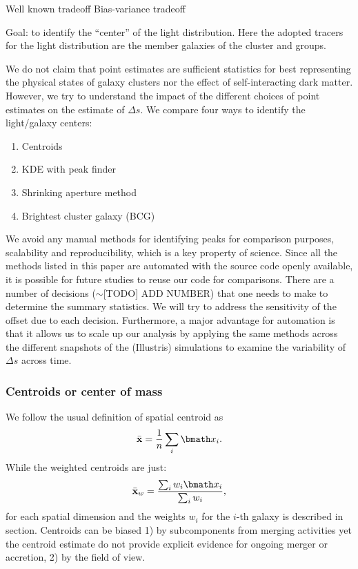 Well known tradeoff Bias-variance tradeoff

Goal: to identify the ``center'' of the light distribution. Here the adopted 
tracers for the light distribution are the member galaxies of the cluster 
and groups.

We do not claim that point estimates are sufficient statistics for
best representing the physical states of galaxy clusters nor the effect of
self-interacting dark matter. However, we try to understand the impact of the
different choices of point estimates on the estimate of $\Delta s$. 
We compare four ways to identify the light/galaxy centers:
\begin{enumerate}
\item Centroids
\item KDE with peak finder
\item Shrinking aperture method
\item Brightest cluster galaxy (BCG)

\end{enumerate}
We avoid any manual methods for identifying peaks for
comparison purposes, scalability and reproducibility, 
which is a key property of science. 
Since all the methods listed in this
paper are automated with the source code openly available, 
it is possible for future studies to reuse our code for comparisons. 
There are a number of decisions ($\sim $[TODO] ADD NUMBER) that one needs to make to 
determine the summary statistics. We will try to address the sensitivity of the offset
due to each decision. 
Furthermore, a major advantage for automation is that it allows us  
to scale up our analysis by applying
the same methods across the different snapshots of the (Illustris) simulations to
examine the variability of $\Delta s$ across time. 


\subsubsection{Centroids or center of mass}
\label{Unweighted}
We follow the usual definition of spatial centroid as 
\begin{equation}
	\bar{\bf x} = \frac{1}{n} \sum_i \vec{x}_i. 
\end{equation}
While the weighted centroids are just: 
\begin{equation}
	\bar{\bf x}_w = \frac{\sum_i w_i \vec{x}_i}{\sum_i w_i},
\end{equation}
for each spatial dimension and the weights $w_i$ for the $i$-th galaxy
is described in section.
Centroids can be biased 1) by subcomponents from merging activities yet the
centroid estimate do not provide explicit evidence for ongoing merger or 
accretion, 2) by the field of view.

